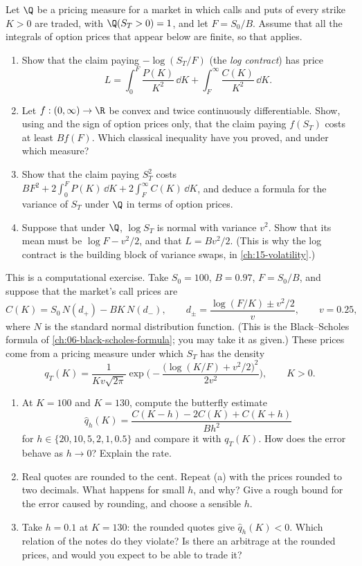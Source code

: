 \begin{exercise}\label{ex:arb-log}
\medium Let $\Q$ be a pricing measure for a market in which calls and puts of every strike
$K>0$ are traded, with $\Q(S_T>0)=1$, and let $F=S_0/B$. Assume that all the integrals of
option prices that appear below are finite, so that  applies.
\begin{enumerate}[label=(\alph*)]
  \item Show that the claim paying $-\log(S_T/F)$ (the \emph{log contract}) has price
    \[
      L=\int_0^F\frac{P(K)}{K^2}\,\dd K+\int_F^\infty\frac{C(K)}{K^2}\,\dd K .
    \]
  \item Let $f:(0,\infty)\to\R$ be convex and twice continuously differentiable. Show, using
     and the sign of option prices only, that the claim paying
    $f(S_T)$ costs at least $Bf(F)$. Which classical inequality have you proved, and under
    which measure?
  \item Show that the claim paying $S_T^2$ costs
    $BF^2+2\int_0^FP(K)\,\dd K+2\int_F^\infty C(K)\,\dd K$, and deduce a formula for the
    variance of $S_T$ under $\Q$ in terms of option prices.
  \item Suppose that under $\Q$, $\log S_T$ is normal with variance $v^2$. Show that its mean
    must be $\log F-v^2/2$, and that $L=Bv^2/2$. (This is why the log contract is the
    building block of variance swaps, in \cref{ch:15-volatility}.)
\end{enumerate}
\end{exercise}

\begin{exercise}\label{ex:arb-density}
\medium This is a computational exercise. Take $S_0=100$, $B=0.97$, $F=S_0/B$, and suppose
that the market's call prices are
\[
  C(K)=S_0\,N(d_+)-BK\,N(d_-),\qquad d_\pm=\frac{\log(F/K)\pm v^2/2}{v},\qquad v=0.25,
\]
where $N$ is the standard normal distribution function. (This is the Black--Scholes formula of
\cref{ch:06-black-scholes-formula}; you may take it as given.) These prices come from a
pricing measure under which $S_T$ has the density
\[
  q_T(K)=\frac{1}{Kv\sqrt{2\pi}}\exp\Big(-\frac{\big(\log(K/F)+v^2/2\big)^2}{2v^2}\Big),
  \qquad K>0 .
\]
\begin{enumerate}[label=(\alph*)]
  \item At $K=100$ and $K=130$, compute the butterfly estimate
    \[
      \hat q_h(K)=\frac{C(K-h)-2C(K)+C(K+h)}{Bh^2}
    \]
    for $h\in\{20,10,5,2,1,0.5\}$ and compare it with $q_T(K)$. How does the error behave as
    $h\to0$? Explain the rate.
  \item Real quotes are rounded to the cent. Repeat (a) with the prices rounded to two
    decimals. What happens for small $h$, and why? Give a rough bound for the error caused by
    rounding, and choose a sensible $h$.
  \item Take $h=0.1$ at $K=130$: the rounded quotes give $\hat q_h(K)<0$. Which relation of
    the notes do they violate? Is there an arbitrage at the rounded prices, and would you
    expect to be able to trade it?
\end{enumerate}
\end{exercise}


